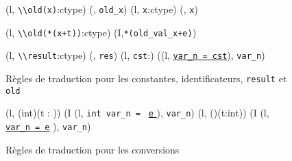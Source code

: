 \begin{figure*}[bt]
  \scriptsize{
    {
      {(l, \mbox{\lstinline'\\old(x)'}:ctype) 
        (\emptylist, \mbox{\lstinline'old_x'})}
    }
    {
      {(l, \mbox{\lstinline'x'}:ctype) 
        (\emptylist, \mbox{\lstinline'x'})}
    }

    {
      {(l, \mbox{\lstinline'\\old(*(x+t))'}:ctype) 
        (I,\mbox{\lstinline'*(old_val_x+e)'})}
    }

    {
      {(l, \mbox{\lstinline'\\result'}:ctype) 
        (\emptylist, \mbox{\lstinline'res'})}
    }
    {
      {(l, \mbox{\lstinline'cst'}:) 
        ((l, \underline{\Zinit\mbox{\lstinline'var_n = cst'}}),
        \mbox{\lstinline'var_n'})}
    }
  }
  \caption{Règles de traduction pour les constantes, identificateurs,
    \lstinline'result' et \lstinline'old'}
  \label{fig:const-id}
\end{figure*}

\begin{figure*}[bt]
  \scriptsize{
    {
      {
        (l, (int)(t : )) 
        (I \concat (l,
        \mbox{\lstinline'int var_n ='}~
        \underline{\mbox{\lstinline'e'} \Zclear}
        \semicolon
        ), \mbox{\lstinline'var_n'})
      }
    }
    {
      {(l, ()(t:int))  (I \concat (l,
        \underline{\Zinit \mbox{\lstinline'var_n = e'}}
        \semicolon
        ), \mbox{\lstinline'var_n'})}
    }
  }
  \caption{Règles de traduction pour les conversions}
  \label{fig:coerce}
\end{figure*}

